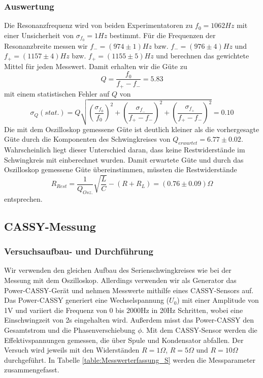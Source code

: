 \documentclass[12pt,a4paper]{article}
\begin{document}
\subsubsection{Auswertung}
Die Resonanzfrequenz wird von beiden Experimentatoren zu $f_0=1062Hz$ mit einer Unsicherheit von $\sigma_{f_0}=1Hz$ bestimmt. Für die Frequenzen der Resonanzbreite messen wir $f_-=(974\pm1)Hz$ bzw. $f_-=(976\pm4)Hz$ und $f_+=(1157\pm4)Hz$ bzw. $f_+=(1155\pm5)Hz$ und berechnen das gewichtete Mittel für jeden Messwert. Damit erhalten wir die Güte zu
\begin{equation}
Q=\frac{f_0}{f_+-f_-}=5.83
\end{equation}
mit einem statistischen Fehler auf $Q$ von
\begin{equation}
\sigma_Q(stat.)=Q\sqrt{\left(\frac{\sigma_{f_0}}{f_0}\right)^2+\left(\frac{\sigma_{f_-}}{f_+-f_-}\right)^2+\left(\frac{\sigma_{f_+}}{f_+-f_-}\right)^2}=0.10
\end{equation}
Die mit dem Oszilloskop gemessene Güte ist deutlich kleiner als die vorhergesagte Güte durch die Komponenten des Schwingkreises von $Q_{erwartet}=6.77\pm0.02$. Wahrscheinlich liegt dieser Unterschied daran, dass keine Restwiderstände im Schwingkreis mit einberechnet wurden. Damit erwartete Güte und durch das Oszilloskop gemessene Güte übereinstimmen, müssten die Restwiderstände
\begin{equation}
R_{Rest}=\frac{1}{Q_{Osz.}}\sqrt{\frac{L}{C}}-(R+R_L)=(0.76\pm0.09)\Omega
\end{equation}
entsprechen.
\subsection{CASSY-Messung}
\subsubsection{Versuchsaufbau- und Durchführung}
Wir verwenden den gleichen Aufbau des Serienschwingkreises wie bei der Messung mit dem Oszilloskop. Allerdings verwenden wir als Generator das Power-CASSY-Gerät und nehmen Messwerte mithilfe eines CASSY-Sensors auf. Das Power-CASSY generiert eine Wechselspannung ($U_0$) mit einer Amplitude von 1V und variiert die Frequenz von 0 bis 2000Hz in 20Hz Schritten, wobei eine Einschwingzeit von 2s eingehalten wird. Außerdem misst das Power-CASSY den Gesamtstrom und die Phasenverschiebung $\phi$. Mit dem CASSY-Sensor werden die Effektivspannungen gemessen, die über Spule und Kondensator abfallen. Der Versuch wird jeweils mit den Widerständen $R=1\Omega$, $R=5\Omega$ und $R=10\Omega$ durchgeführt. In Tabelle \ref{table:Messwerterfassung_S} werden die Messparameter zusammengefasst.
\end{document}
